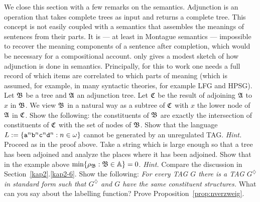 We close this section with a few remarks on the semantics. Adjunction 
is an operation that takes complete trees as input and returns a 
complete tree. This concept is not easily coupled with a semantics 
that assembles the meanings of sentences from their parts. It is 
--- at least in Montague semantics --- impossible to recover the 
meaning components of a sentence after completion, which would be 
necessary for a compositional account.  \cite{harris:structures} 
only gives a modest sketch of how adjunction 
is done in semantics. Principally, for this to work one needs a full 
record of which items are correlated to which parts of meaning 
(which is assumed, for example, in many syntactic theories, for 
example LFG and HPSG).
\vplatz
\exercise
\label{ex:tagstruct}
Let $\mathfrak{B}$ be a tree and $\mathfrak{A}$ an adjunction tree. Let $\mathfrak{C}$
be the result of adjoining $\mathfrak{A}$ to $x$ in $\mathfrak{B}$. We view
$\mathfrak{B}$ in a natural way as a subtree of $\mathfrak{C}$ with $x$
the lower node of $\mathfrak{A}$ in $\mathfrak{C}$. Show the following: the
constituents of $\mathfrak{B}$ are exactly the intersection of constituents
of $\mathfrak{C}$ with the set of nodes of $\mathfrak{B}$.
%
\vplatz
\exercise
Show that the language $L := \{\mbox{\tt a}^n\mbox{\tt b}^n%
\mbox{\tt c}^n\mbox{\tt d}^n : n \in \omega\}$  cannot be
generated by an unregulated TAG. {\it Hint.} Proceed as in the
proof above.  Take a string which is large enough so that a tree
has been adjoined and analyze the places where it has been
adjoined.
\vplatz
\exercise
Show that in the example above $\min \{\rho_{\mathfrak{B}} : \mathfrak{B} \in \mathbb{A}\} = 0$. 
{\it Hint.} Compare the discussion in Section~\ref{kap2}.\ref{kap2-6}.
\vplatz
\exercise
Show the following: {\it For every TAG $G$ there is a
TAG $G^{\diamondsuit}$ in standard form such that
$G^{\diamondsuit}$ and $G$ have the same constituent structures.}
What can you say about the labelling function?
\vplatz
\exercise
Prove Proposition~\ref{prop:nverzweig}.
